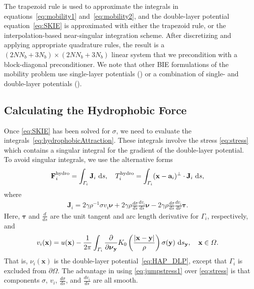 \documentclass[lineno]{jfm}
\renewcommand{\aa}{\mathbf{a}}
\newcommand{\bd}{\partial}
\newcommand{\FF}{\mathbf{F}}
\newcommand{\JJ}{\mathbf{J}}
\newcommand{\nnu}{\boldsymbol{\nu}}
\newcommand{\ttau}{\boldsymbol{\tau}}
\newcommand{\xx}{\mathbf{x}}
\newcommand{\yy}{\mathbf{y}}
\newcommand{\pderiv}[2]{\frac{\partial #1}{\partial #2}}
\begin{document}
The trapezoid rule is used to approximate the integrals in
equations~\eqref{eq:mobility1} and~\eqref{eq:mobility2}, and the
double-layer potential equation~\eqref{eq:SKIE} is approximated with
either the trapezoid rule, or the interpolation-based near-singular
integration scheme. After discretizing and applying appropriate
quadrature rules, the result is a $(2NN_b + 3N_b) \times (2NN_b + 3N_b)$
linear system that we precondition with a block-diagonal preconditioner.
We note that other BIE formulations of the mobility problem use
single-layer potentials (\cite{cor-gre-rac-vee2017, rac-gre2016}) or a
combination of single- and double-layer potentials (\cite{cor-vee2018}).

\subsection{Calculating the Hydrophobic Force}
\label{subsec:calculating_force}
Once \eqref{eq:SKIE} has been solved for $\sigma$, we need to evaluate
the integrals~\eqref{eq:hydrophobicAttraction}. These integrals involve
the stress \eqref{eq:stress} which contains a singular integral for the
gradient of the double-layer potential. To avoid singular integrals, we
use the alternative forms
\begin{align}
  \label{eq:recipforcetorque}
  \FF_i^{\text{hydro}} = \int_{\Gamma_i} \JJ_i \,\dif s,\quad
  T_i^{\text{hydro}}    = \int_{\Gamma_i} 
    (\xx - \aa_i)^{\perp} \cdot \JJ_i  \,\dif s,
\end{align}
where
\begin{align}
  \label{eq:jumpstress1}
  \JJ_{i} = 2\gamma\rho^{-1} \sigma v_i \nnu + 
    2\gamma\rho \frac{d\sigma}{ds} \frac{dv_i}{ds} \nnu -
    2\gamma\rho \frac{d\sigma}{ds} \frac{dv_i}{d\nu} \ttau.
\end{align}
Here, $\ttau$ and $\frac{d}{ds}$ are the unit tangent  and arc length
derivative for $\Gamma_i$, respectively, and
\begin{equation}
\label{eq:uidef}
    v_i(\xx) = u(\xx) - \frac{1}{2\pi} \int_{\Gamma_i} \pderiv{}{\nnu_\yy}
    K_0 \left(\frac{|\xx - \yy|}{\rho}\right) \sigma(\yy) \, \dif s_\yy,
    \quad \xx \in \Omega.
\end{equation}
That is, $\nu_i(\xx)$ is the double-layer potential~\eqref{eq:HAP_DLP},
except that $\Gamma_i$ is excluded from $\bd\Omega$. The advantage in
using \eqref{eq:jumpstress1} over \eqref{eq:stress} is that components
$\sigma$, $v_i$, $\frac{d\sigma}{ds}$, and $\frac{dv_i}{ds}$ are all
smooth.
\end{document}
